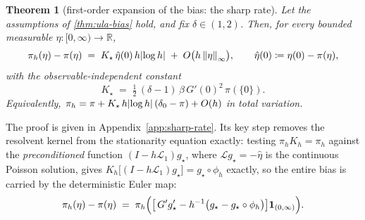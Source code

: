 \documentclass[aap,preprint]{imsart}
\DeclarePairedDelimiter{\Vpair}{\|}{\|} %
\DeclarePairedDelimiter{\vpair}{|}{|} %
\newcommand\norm[2][0pt]{\Vpair*{#2}} %
\newcommand\snorm[1]{\norm{\smash{#1}}} %
\newcommand\abs[2][0pt]{\vpair*{#2}} %
\numberwithin{equation}{section}
\theoremstyle{plain}
\newtheorem{theorem}{Theorem}[section]
\theoremstyle{definition}
\begin{document}
\begin{theorem}[first-order expansion of the bias: the sharp rate]\label{thm:sharp-rate}
  Let the assumptions of \cref{thm:ula-bias} hold, and fix $\delta\in(1,2)$.  Then, for every bounded measurable $\eta\colon[0,\infty)\to\mathbb R$,
  \begin{equation}\label{eq:sharp-law}
    \pi_h(\eta)-\pi(\eta)\;=\;K_\star\,\hat\eta(0)\,h\abs{\log h } \;+\;O\bigl(h\,\snorm{\eta}_\infty\bigr),
    \qquad \hat\eta(0)\coloneqq \eta(0)-\pi(\eta),
  \end{equation}
  with the observable-independent constant
  \begin{equation}\label{eq:Kstar}
    K_\star\;=\;\tfrac12\,(\delta-1)\,\beta\,G'(0)^2\,\pi(\{0\}) .
  \end{equation}
  Equivalently, $\pi_h=\pi+K_\star\,h\abs{\log h } \,(\delta_0-\pi)+O(h)$ in total variation. 
\end{theorem}

The proof is given in Appendix~\ref{app:sharp-rate}.  Its key step removes the resolvent kernel from the stationarity equation exactly: testing $\pi_hK_h=\pi_h$ against the \emph{preconditioned} function $(I-h\mathcal L_1)g_\star$, where $\mathcal Lg_\star=-\hat\eta$ is the continuous Poisson solution, gives $K_h\bigl[(I-h\mathcal L_1)g_\star\bigr]=g_\star\circ\phi_h$ exactly, so the entire bias is carried by the deterministic Euler map:
\begin{equation}\label{eq:precond-identity}
  \pi_h(\eta)-\pi(\eta)
  \;=\;\pi_h\Bigl(\bigl[\,G'g_\star'-h^{-1}\bigl(g_\star-g_\star\circ\phi_h\bigr)\bigr]\mathbf 1_{(0,\infty)}\Bigr).
\end{equation}
\end{document}
